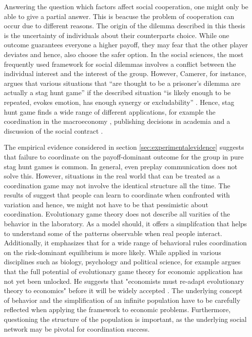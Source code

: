 
Answering the question which factors affect social cooperation, one might
only be able to give a partial answer. 
This is beacuse the problem of cooperation can occur due to different
reasons.
The origin of the dilemma described in this thesis is the uncertainty 
of individuals about their counterparts choice. 
While one outcome guarantees everyone a higher 
payoff, they may fear that the other player deviates and hence, also choose 
the safer option. 
In the social sciences, the most frequently used framework for social dilemmas
involves a conflict between the individual interest and the interest of 
the group.
However, Camerer, for instance, argues that various situations that 
``are thought to be a prisoner's 
dilemma are actually a stag hunt game'' 
if the described situation ``is likely enough to be repeated, evokes emotion, 
has enough synergy or excludability'' 
\parencite[376-377]{camerer_behavioral_2003}. Hence, 
stag hunt game finds a wide range of different applications,
for example the coordination in  the macroeconomy \parencite{bryant_coordination_1994}, 
publishing decisions in academia \parencite{hanauske_evolutionare_2011} and
a discussion of the social contract \parencite{skyrms_stag_2004}.

The empirical evidence considered in section \ref{sec:experimentalevidence}
suggests that failure to coordinate on the payoff-dominant 
outcome for the group in pure stag hunt games is common. 
In general, even preplay communication does not solve this.
However, situations in the real world that can be treated as a coordination
game may not involve the identical structure all the time. The
results of \textcite{rankin_strategic_2000} suggest that people can learn 
to coordinate when confronted with variation and hence, we might not
have to be that pessimistic about coordination.
Evolutionary game theory does not describe all varities of the 
behavior in the laboratory. As a model should, it offers a simplifcation
that helps to understand some of the patterns observable when real people
interact. Additionally, it emphasizes that for a wide range
of behavioral rules coordination on the risk-dominant equilibrium
is more likely. While applied in various disciplines such as biology, 
psychology and political science, for example 
\textcite{friedman_economic_1998} argues that the full potential
of evolutionary game theory for economic application 
has not yet been unlocked. He suggests that "economists must re-adapt
evolutionary theory to economics" before it will be widely accepted 
\parencite[18]{friedman_economic_1998}. The underlying concept of behavior and
the simplification of an infinite population have to be carefully reflected
when applying the framework to economic problems. Furthermore, questioning
the structure of the population is important, as the underlying social
network may be pivotal for coordination success.
